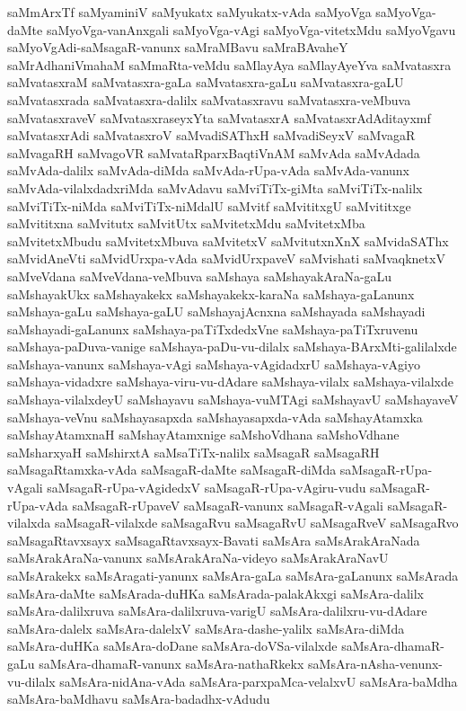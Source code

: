 {saMmArxTf
saMyaminiV
saMyukatx
saMyukatx-vAda
saMyoVga
saMyoVga-daMte
saMyoVga-vanAnxgali
saMyoVga-vAgi
saMyoVga-vitetxMdu
saMyoVgavu
saMyoVgAdi-saMsagaR-vanunx
saMraMBavu
saMraBAvaheY
saMrAdhaniVmahaM
saMmaRta-veMdu
saMlayAya
saMlayAyeYva
saMvatasxra
saMvatasxraM
saMvatasxra-gaLa
saMvatasxra-gaLu
saMvatasxra-gaLU
saMvatasxrada
saMvatasxra-dalilx
saMvatasxravu
saMvatasxra-veMbuva
saMvatasxraveV
saMvatasxraseyxYta
saMvatasxrA
saMvatasxrAdAditayxmf
saMvatasxrAdi
saMvatasxroV
saMvadiSAThxH
saMvadiSeyxV
saMvagaR
saMvagaRH
saMvagoVR
saMvataRparxBaqtiVnAM
saMvAda
saMvAdada
saMvAda-dalilx
saMvAda-diMda
saMvAda-rUpa-vAda
saMvAda-vanunx
saMvAda-vilalxdadxriMda
saMvAdavu
saMviTiTx-giMta
saMviTiTx-nalilx
saMviTiTx-niMda
saMviTiTx-niMdalU
saMvitf
saMvititxgU
saMvititxge
saMvititxna
saMvitutx
saMvitUtx
saMvitetxMdu
saMvitetxMba
saMvitetxMbudu
saMvitetxMbuva
saMvitetxV
saMvitutxnXnX
saMvidaSAThx
saMvidAneVti
saMvidUrxpa-vAda
saMvidUrxpaveV
saMvishati
saMvaqknetxV
saMveVdana
saMveVdana-veMbuva
saMshaya
saMshayakAraNa-gaLu
saMshayakUkx
saMshayakekx
saMshayakekx-karaNa
saMshaya-gaLanunx
saMshaya-gaLu
saMshaya-gaLU
saMshayajAcnxna
saMshayada
saMshayadi
saMshayadi-gaLanunx
saMshaya-paTiTxdedxVne
saMshaya-paTiTxruvenu
saMshaya-paDuva-vanige
saMshaya-paDu-vu-dilalx
saMshaya-BArxMti-galilalxde
saMshaya-vanunx
saMshaya-vAgi
saMshaya-vAgidadxrU
saMshaya-vAgiyo
saMshaya-vidadxre
saMshaya-viru-vu-dAdare
saMshaya-vilalx
saMshaya-vilalxde
saMshaya-vilalxdeyU
saMshayavu
saMshaya-vuMTAgi
saMshayavU
saMshayaveV
saMshaya-veVnu
saMshayasapxda
saMshayasapxda-vAda
saMshayAtamxka
saMshayAtamxnaH
saMshayAtamxnige
saMshoVdhana
saMshoVdhane
saMsharxyaH
saMshirxtA
saMsaTiTx-nalilx
saMsagaR
saMsagaRH
saMsagaRtamxka-vAda
saMsagaR-daMte
saMsagaR-diMda
saMsagaR-rUpa-vAgali
saMsagaR-rUpa-vAgidedxV
saMsagaR-rUpa-vAgiru-vudu
saMsagaR-rUpa-vAda
saMsagaR-rUpaveV
saMsagaR-vanunx
saMsagaR-vAgali
saMsagaR-vilalxda
saMsagaR-vilalxde
saMsagaRvu
saMsagaRvU
saMsagaRveV
saMsagaRvo
saMsagaRtavxsayx
saMsagaRtavxsayx-Bavati
saMsAra
saMsArakAraNada
saMsArakAraNa-vanunx
saMsArakAraNa-videyo
saMsArakAraNavU
saMsArakekx
saMsAragati-yanunx
saMsAra-gaLa
saMsAra-gaLanunx
saMsArada
saMsAra-daMte
saMsArada-duHKa
saMsArada-palakAkxgi
saMsAra-dalilx
saMsAra-dalilxruva
saMsAra-dalilxruva-varigU
saMsAra-dalilxru-vu-dAdare
saMsAra-dalelx
saMsAra-dalelxV
saMsAra-dashe-yalilx
saMsAra-diMda
saMsAra-duHKa
saMsAra-doDane
saMsAra-doVSa-vilalxde
saMsAra-dhamaR-gaLu
saMsAra-dhamaR-vanunx
saMsAra-nathaRkekx
saMsAra-nAsha-venunx-vu-dilalx
saMsAra-nidAna-vAda
saMsAra-parxpaMca-velalxvU
saMsAra-baMdha
saMsAra-baMdhavu
saMsAra-badadhx-vAdudu
}
